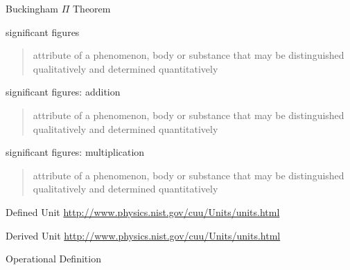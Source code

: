 \documentclass[avery5371,grid]{flashcards}
\begin{document}




\begin{flashcard}[Defintion]{Buckingham $\Pi$ Theorem}
\vspace{\fill}

\vspace{\fill}
\end{flashcard}

\begin{flashcard}[Defintion]{significant figures}
\hfill\vfill
\begin{quote}
    attribute of a phenomenon, body or substance that may be distinguished qualitatively and determined quantitatively
\end{quote}
\vfill
\end{flashcard}

\begin{flashcard}[Defintion]{significant figures: addition}
\hfill\vfill
\begin{quote}
    attribute of a phenomenon, body or substance that may be distinguished qualitatively and determined quantitatively
\end{quote}
\vfill
\end{flashcard}

\begin{flashcard}[Defintion]{significant figures: multiplication}
\hfill\vfill
\begin{quote}
    attribute of a phenomenon, body or substance that may be distinguished qualitatively and determined quantitatively
\end{quote}
\vfill
\end{flashcard}


\begin{flashcard}[Defintion]{Defined Unit}
\vfill
\footnotesize\flushright \url{http://www.physics.nist.gov/cuu/Units/units.html}
\end{flashcard}

\begin{flashcard}[Defintion]{Derived Unit}
\vfill
\footnotesize\flushright \url{http://www.physics.nist.gov/cuu/Units/units.html}
\end{flashcard}

\begin{flashcard}[Defintion]{Operational Definition}
\end{flashcard}
\end{document}
